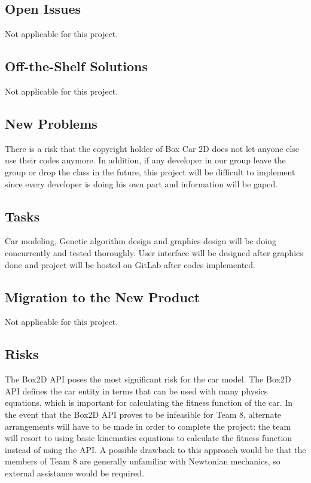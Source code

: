 \documentclass[12pt, titlepage]{article}
\begin{document}
\subsection{Open Issues}
Not applicable for this project.

\subsection{Off-the-Shelf Solutions}
Not applicable for this project.

\subsection{New Problems}
There is a risk that the copyright holder of Box Car 2D does not let anyone
 else use their codes anymore. In addition, if any developer in our group 
leave the group or drop the class in the future, this project will be 
difficult to implement since every developer is doing his own part and
 information will be gaped.

\subsection{Tasks}
Car modeling, Genetic algorithm design and graphics design will be doing 
concurrently and tested thoroughly. User interface will be designed after 
graphics done and project will be hosted on GitLab after codes implemented.

\subsection{Migration to the New Product}
Not applicable for this project.

\subsection{Risks}
The Box2D API poses the most signiﬁcant risk for the car model. The Box2D 
API deﬁnes the car entity in terms that can be used with many physics 
equations, which is important for calculating the ﬁtness function of the 
car. In the event that the Box2D API proves to be infeasible for Team 8, 
alternate arrangements will have to be made in order to complete the
project: the team will resort to using basic kinematics equations to calculate 
the ﬁtness function instead of using the API. A possible drawback to this 
approach would be that the members of Team 8 are generally unfamiliar with 
Newtonian mechanics, so external assistance would be required. 
\end{document}
